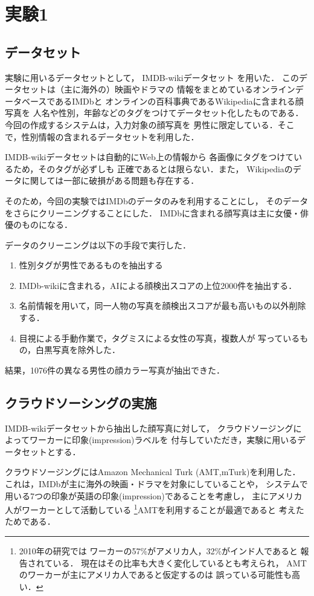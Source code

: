 \chapter{実験1}
\section{データセット \label{sec:ch2:dataset}}
実験に用いるデータセットとして，
IMDB-wikiデータセット
\cite{Rothe-ICCVW-2015,Rothe-IJCV-2018,imdb-wiki}を用いた．
このデータセットは（主に海外の）映画やドラマの
情報をまとめているオンラインデータベースであるIMDbと
オンラインの百科事典であるWikipediaに含まれる顔写真を
人名や性別，年齢などのタグをつけてデータセット化したものである．
今回の作成するシステムは，入力対象の顔写真を
男性に限定している．そこで，性別情報の含まれるデータセットを利用した．

IMDB-wikiデータセットは自動的にWeb上の情報から
各画像にタグをつけているため，そのタグが必ずしも
正確であるとは限らない．また，
Wikipediaのデータに関しては一部に破損がある問題も存在する．

そのため，今回の実験ではIMDbのデータのみを利用することにし，
そのデータをさらにクリーニングすることにした．
IMDbに含まれる顔写真は主に女優・俳優のものになる．

データのクリーニングは以下の手段で実行した．
\begin{enumerate}
  \item 性別タグが男性であるものを抽出する
  \item IMDb-wikiに含まれる，AIによる顔検出スコアの上位2000件を抽出する．
  \item 名前情報を用いて，同一人物の写真を顔検出スコアが最も高いもの以外削除する．
  \item 目視による手動作業で，タグミスによる女性の写真，複数人が
  写っているもの，白黒写真を除外した．
\end{enumerate}
結果，1076件の異なる男性の顔カラー写真が抽出できた．

\section{クラウドソーシングの実施}
IMDB-wikiデータセットから抽出した顔写真に対して，
クラウドソージングによってワーカーに印象(impression)ラベルを
付与していただき，実験に用いるデータセットとする．

クラウドソージングにはAmazon Mechanical Turk (AMT,mTurk)を利用した．
これは，IMDbが主に海外の映画・ドラマを対象にしていることや，
システムで用いる7つの印象が英語の印象(impression)であることを考慮し，
主にアメリカ人がワーカーとして活動している
\footnote{
2010年の研究では
ワーカーの57\%がアメリカ人，32\%がインド人であると
報告されている\cite{10.1145/1753846.1753873}．
現在はその比率も大きく変化しているとも考えられ，
AMTのワーカーが主にアメリカ人であると仮定するのは
誤っている可能性も高い．
}AMTを利用することが最適であると
考えたためである．

